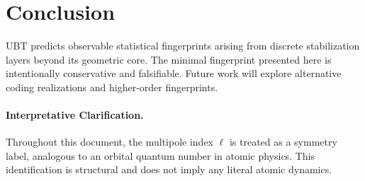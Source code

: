 \documentclass[11pt]{article}
\begin{document}
\section{Conclusion}

UBT predicts observable statistical fingerprints arising from discrete
stabilization layers beyond its geometric core. The minimal fingerprint
presented here is intentionally conservative and falsifiable. Future
work will explore alternative coding realizations and higher-order
fingerprints.

\paragraph{Interpretative Clarification.}
Throughout this document, the multipole index $\ell$ is treated as a symmetry label,
analogous to an orbital quantum number in atomic physics. This identification is
structural and does not imply any literal atomic dynamics.
\end{document}
